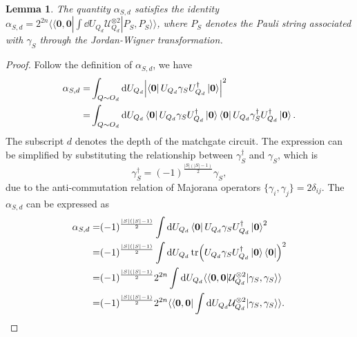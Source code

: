 \documentclass[journal=jctcce,a4paper,manuscript=article]{achemso}
\newtheorem{lemma}{Lemma}
\newcommand{\supket}[1]{|#1 \rangle\rangle}
\newcommand{\supbra}[1]{\langle\langle #1 |}
\begin{document}
\begin{table}
  \label{table: the 16x16 matrix of T}
\end{table}

\begin{lemma}
  \label{lemma: The net phase of alpha is 1}
  The quantity $\alpha_{S,d}$ satisfies the identity $\alpha_{S,d} = 2^{2n} \supbra{\bm{0}, \bm{0}} \int \dd U_{Q_d} \mathcal{U}_{Q_d}^{\otimes 2} \supket{P_S, P_S}$, where $P_S$ denotes the Pauli string associated with $\gamma_S$ through the Jordan-Wigner transformation.
\end{lemma}
\begin{proof}

  Follow the definition of $\alpha_{S,d}$, we have
  \begin{align}
    \alpha_{S,d} = & \int_{Q\sim O_d } \dd U_{Q_d} \abs{\bra{\bm 0} U_{Q_d} \gamma_S U_{Q_d}^\dagger \ket{\bm 0}}^2                                                          \\
    =              & \int_{Q\sim O_d } \dd U_{Q_d} \bra{\bm 0} U_{Q_d} \gamma_S U_{Q_d}^\dagger \ket{\bm 0}\bra{\bm 0} U_{Q_d} \gamma_S^\dagger U_{Q_d}^\dagger \ket{\bm 0}.
  \end{align}
  The subscript $d$ denotes the depth of the matchgate circuit.
  The expression can be simplified by substituting the relationship between $\gamma_S^\dagger$ and $\gamma_S$, which is
  \begin{equation}
    \gamma_S^\dagger = (-1)^{\frac{|S|(|S|-1)}{2}}\gamma_S,
  \end{equation}
  due to the anti-commutation relation of Majorana operators $\{\gamma_i, \gamma_j\} = 2\delta_{ij}$.
  The $\alpha_{S, d}$ can be expressed as
  \begin{align}
    \alpha_{S,d} = & (-1)^{\frac{|S|(|S|-1)}{2}}\int \dd U_{Q_d}
    \bra{\bm 0}U_{Q_d} \gamma_SU_{Q_d}^\dagger\ket{\bm 0}^2                                                                                              \\
    =              & (-1)^{\frac{|S|(|S|-1)}{2}} \int \dd U_{Q_d}
    \tr(U_{Q_d} \gamma_SU_{Q_d}^\dagger\ket{\bm 0} \bra{\bm 0} )^2                                                                                       \\
    =              & (-1)^{\frac{|S|(|S|-1)}{2}} 2^{2n} \int \dd U_{Q_d}
    \supbra{\bm 0,\bm 0} \mathcal{U}_{Q_d}^{\otimes 2} \supket{\gamma_S,\gamma_S}                                                                        \\
    =              & (-1)^{\frac{|S|(|S|-1)}{2}} 2^{2n}  \supbra{\bm 0,\bm 0}  \int\dd U_{Q_d} \mathcal{U}_{Q_d}^{\otimes 2} \supket{\gamma_S,\gamma_S}.
    \label{appendix eq: alpha to net}
  \end{align}


\end{proof}
\end{document}
